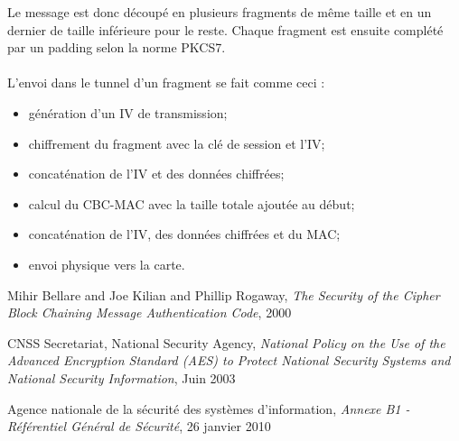 \documentclass[a4paper,11pt,french]{article}
\begin{document}
Le message est donc découpé en plusieurs fragments de même taille et en un 
dernier de taille inférieure pour le reste. Chaque fragment est ensuite complété
par un padding selon la norme PKCS7.

\paragraph{}
L'envoi dans le tunnel d'un fragment se fait comme ceci : 
\begin{itemize}
    \item génération d'un IV de transmission;
    \item chiffrement du fragment avec la clé de session et l'IV;
    \item concaténation de l'IV et des données chiffrées;
    \item calcul du CBC-MAC avec la taille totale ajoutée au début;
    \item concaténation de l'IV, des données chiffrées et du MAC;
    \item envoi physique vers la carte.
\end{itemize} 
\begin{thebibliography}{9}


    Mihir Bellare and Joe Kilian and Phillip Rogaway,
  \emph{The Security of the Cipher Block Chaining Message Authentication Code},
    2000

CNSS Secretariat, National Security Agency,
\emph{National Policy on the Use of the Advanced Encryption Standard (AES) to 
Protect National Security Systems and National Security Information},
Juin 2003

Agence nationale de la sécurité des systèmes d’information,
\emph{Annexe B1 - Référentiel Général de Sécurité}, 26 janvier 2010
\end{thebibliography}
\end{document}
